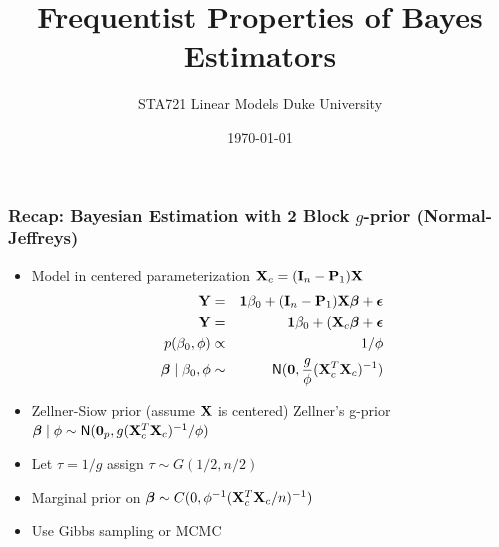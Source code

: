\documentclass[]{beamer}\usepackage[]{graphicx}\usepackage[]{color}
\title{Frequentist Properties of Bayes Estimators}
\institute{Merlise Clyde}
\author{STA721 Linear Models Duke University}
\date{\today}
\begin{document}
\maketitle



\begin{frame}[t]
  \frametitle{Recap: Bayesian Estimation with 2 Block $g$-prior (Normal-Jeffreys)}

\begin{itemize}
  \item

Model in centered parameterization $\mathbf{X}_c = (\mathbf{I}_n - \mathbf{P}_1) \mathbf{X}$
\begin{eqnarray*}
\mathbf{Y} & = & \mathbf{1} \beta_0 + (\mathbf{I}_n - \mathbf{P}_1) \mathbf{X} \boldsymbol{\beta} + \boldsymbol{\epsilon} \\
\mathbf{Y} & = & \mathbf{1} \beta_0 + (\mathbf{X}_c \boldsymbol{\beta} + \boldsymbol{\epsilon} \\
p(\beta_0, \phi) & \propto & 1/\phi\\
\boldsymbol{\beta} \mid \beta_0, \phi & \sim & \textsf{N}(\mathbf{0}, \frac{g}{\phi} (\mathbf{X}_c^T \mathbf{X}_c)^{-1})
\end{eqnarray*}
\pause

\item Zellner-Siow prior (assume $\mathbf{X}$ is centered) \pause
Zellner's g-prior $\boldsymbol{\beta} \mid \phi \sim \textsf{N}(\mathbf{0}_p, g
    (\mathbf{X}_c^T\mathbf{X}_c)^{-1}/\phi)$ \pause

\item Let $\tau = 1/g$ assign $\tau \sim G(1/2, n/2)$ \pause
\item Marginal prior on $\boldsymbol{\beta} \sim C(0, \phi^{-1} (\mathbf{X}_c^T\mathbf{X}_c/n)^{-1})$ \pause
\item Use Gibbs sampling or MCMC
\end{itemize}
\end{frame}
\end{document}
